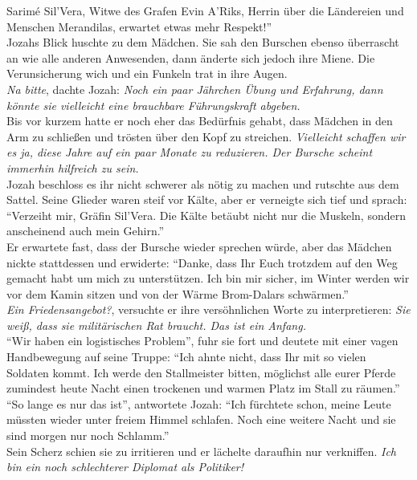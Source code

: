 Sarimé Sil'Vera, Witwe des Grafen Evin A'Riks, Herrin über die Ländereien und Menschen Merandilas, 
erwartet etwas mehr Respekt!''\\
Jozahs Blick huschte zu dem Mädchen. Sie sah den Burschen ebenso überrascht an wie alle anderen 
Anwesenden, dann änderte sich jedoch ihre Miene. Die Verunsicherung wich und ein Funkeln trat in 
ihre Augen.\\
\textit{Na bitte}, dachte Jozah: \textit{Noch ein paar Jährchen Übung und Erfahrung, dann könnte 
sie vielleicht eine brauchbare Führungskraft abgeben.}\\
Bis vor kurzem hatte er noch eher das Bedürfnis gehabt, dass Mädchen in den Arm zu schließen und 
trösten über den Kopf zu streichen. \textit{Vielleicht schaffen wir es ja, diese Jahre auf ein paar 
Monate zu reduzieren. Der Bursche scheint immerhin hilfreich zu sein.}\\
Jozah beschloss es ihr nicht schwerer als nötig zu machen und rutschte aus dem Sattel. Seine 
Glieder waren steif vor Kälte, aber er verneigte sich tief und sprach: ``Verzeiht mir, Gräfin 
Sil'Vera. Die Kälte betäubt nicht nur die Muskeln, sondern anscheinend auch mein Gehirn.''\\
Er erwartete fast, dass der Bursche wieder sprechen würde, aber das Mädchen nickte stattdessen und 
erwiderte: ``Danke, dass Ihr Euch trotzdem auf den Weg gemacht habt um mich zu unterstützen. Ich 
bin mir sicher, im Winter werden wir vor dem Kamin sitzen und von der Wärme Brom-Dalars 
schwärmen.''\\
\textit{Ein Friedensangebot?}, versuchte er ihre versöhnlichen Worte zu interpretieren: \textit{Sie 
weiß, dass sie militärischen Rat braucht. Das ist ein Anfang.}\\
``Wir haben ein logistisches Problem'', fuhr sie fort und deutete mit einer vagen Handbewegung auf 
seine Truppe: ``Ich ahnte nicht, dass Ihr mit so vielen Soldaten kommt. Ich werde den Stallmeister 
bitten, möglichst alle eurer Pferde zumindest heute Nacht einen trockenen und warmen Platz im Stall 
zu räumen.''\\
``So lange es nur das ist'', antwortete Jozah: ``Ich fürchtete schon, meine Leute müssten wieder 
unter freiem Himmel schlafen. Noch eine weitere Nacht und sie sind morgen nur noch Schlamm.''\\
Sein Scherz schien sie zu irritieren und er lächelte daraufhin nur verkniffen. \textit{Ich bin ein 
noch schlechterer Diplomat als Politiker!}\\

